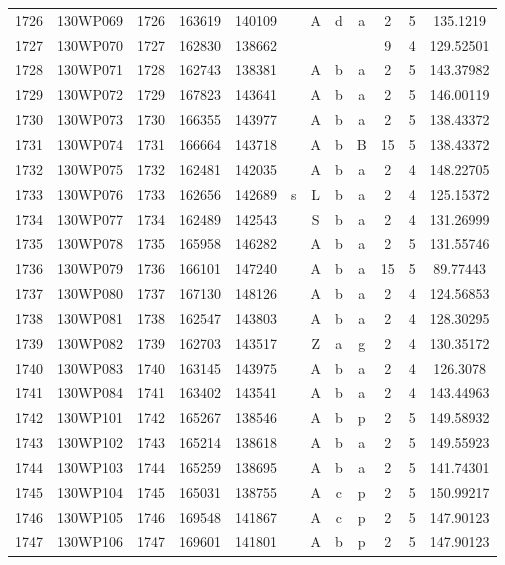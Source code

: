 \begin{tabular}{|*{12}{c|}}
1726 & 130WP069 & 1726 & 163619 & 140109 &  & A & d & a & 2 & 5 & 135.1219 \\ 
1727 & 130WP070 & 1727 & 162830 & 138662 &  &  &  &  & 9 & 4 & 129.52501 \\ 
1728 & 130WP071 & 1728 & 162743 & 138381 &  & A & b & a & 2 & 5 & 143.37982 \\ 
1729 & 130WP072 & 1729 & 167823 & 143641 &  & A & b & a & 2 & 5 & 146.00119 \\ 
1730 & 130WP073 & 1730 & 166355 & 143977 &  & A & b & a & 2 & 5 & 138.43372 \\ 
1731 & 130WP074 & 1731 & 166664 & 143718 &  & A & b & B & 15 & 5 & 138.43372 \\ 
1732 & 130WP075 & 1732 & 162481 & 142035 &  & A & b & a & 2 & 4 & 148.22705 \\ 
1733 & 130WP076 & 1733 & 162656 & 142689 & s & L & b & a & 2 & 4 & 125.15372 \\ 
1734 & 130WP077 & 1734 & 162489 & 142543 &  & S & b & a & 2 & 4 & 131.26999 \\ 
1735 & 130WP078 & 1735 & 165958 & 146282 &  & A & b & a & 2 & 5 & 131.55746 \\ 
1736 & 130WP079 & 1736 & 166101 & 147240 &  & A & b & a & 15 & 5 & 89.77443 \\ 
1737 & 130WP080 & 1737 & 167130 & 148126 &  & A & b & a & 2 & 4 & 124.56853 \\ 
1738 & 130WP081 & 1738 & 162547 & 143803 &  & A & b & a & 2 & 4 & 128.30295 \\ 
1739 & 130WP082 & 1739 & 162703 & 143517 &  & Z & a & g & 2 & 4 & 130.35172 \\ 
1740 & 130WP083 & 1740 & 163145 & 143975 &  & A & b & a & 2 & 4 & 126.3078 \\ 
1741 & 130WP084 & 1741 & 163402 & 143541 &  & A & b & a & 2 & 4 & 143.44963 \\ 
1742 & 130WP101 & 1742 & 165267 & 138546 &  & A & b & p & 2 & 5 & 149.58932 \\ 
1743 & 130WP102 & 1743 & 165214 & 138618 &  & A & b & a & 2 & 5 & 149.55923 \\ 
1744 & 130WP103 & 1744 & 165259 & 138695 &  & A & b & a & 2 & 5 & 141.74301 \\ 
1745 & 130WP104 & 1745 & 165031 & 138755 &  & A & c & p & 2 & 5 & 150.99217 \\ 
1746 & 130WP105 & 1746 & 169548 & 141867 &  & A & c & p & 2 & 5 & 147.90123 \\ 
1747 & 130WP106 & 1747 & 169601 & 141801 &  & A & b & p & 2 & 5 & 147.90123 \\ 

\end{tabular}
